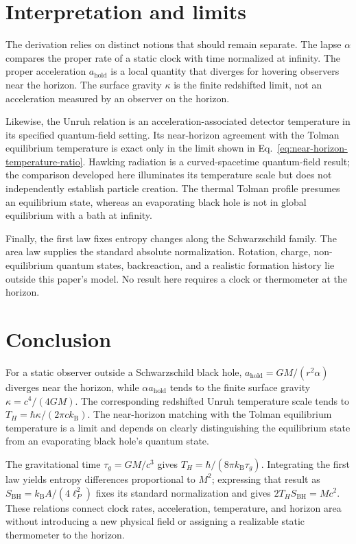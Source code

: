 \documentclass[12pt]{article}
\begin{document}
\section{Interpretation and limits}

The derivation relies on distinct notions that should remain separate. The lapse $\alpha$ compares the proper rate of a static clock with time normalized at infinity. The proper acceleration $a_{\mathrm{hold}}$ is a local quantity that diverges for hovering observers near the horizon. The surface gravity $\kappa$ is the finite redshifted limit, not an acceleration measured by an observer on the horizon.

Likewise, the Unruh relation is an acceleration-associated detector temperature in its specified quantum-field setting. Its near-horizon agreement with the Tolman equilibrium temperature is exact only in the limit shown in Eq.~\eqref{eq:near-horizon-temperature-ratio}. Hawking radiation is a curved-spacetime quantum-field result; the comparison developed here illuminates its temperature scale but does not independently establish particle creation. The thermal Tolman profile presumes an equilibrium state, whereas an evaporating black hole is not in global equilibrium with a bath at infinity.

Finally, the first law fixes entropy changes along the Schwarzschild family. The area law supplies the standard absolute normalization. Rotation, charge, non-equilibrium quantum states, backreaction, and a realistic formation history lie outside this paper's model. No result here requires a clock or thermometer at the horizon.

\section{Conclusion}

For a static observer outside a Schwarzschild black hole, $a_{\mathrm{hold}}=GM/(r^2\alpha)$ diverges near the horizon, while $\alpha a_{\mathrm{hold}}$ tends to the finite surface gravity $\kappa=c^4/(4GM)$. The corresponding redshifted Unruh temperature scale tends to $T_H=\hbar\kappa/(2\pi c k_{\mathrm B})$. The near-horizon matching with the Tolman equilibrium temperature is a limit and depends on clearly distinguishing the equilibrium state from an evaporating black hole's quantum state.

The gravitational time $\tau_g=GM/c^3$ gives $T_H=\hbar/(8\pi k_{\mathrm B}\tau_g)$. Integrating the first law yields entropy differences proportional to $M^2$; expressing that result as $S_{\mathrm{BH}}=k_{\mathrm B}A/(4\ell_P^2)$ fixes its standard normalization and gives $2T_HS_{\mathrm{BH}}=Mc^2$. These relations connect clock rates, acceleration, temperature, and horizon area without introducing a new physical field or assigning a realizable static thermometer to the horizon.
\end{document}
